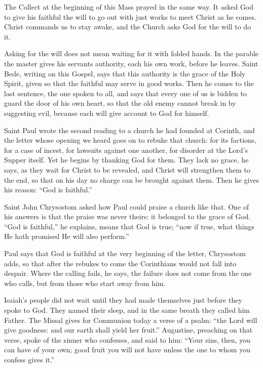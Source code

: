 The Collect at the beginning of this Mass prayed in the same way. It asked
God to give his faithful the will to go out with just works to meet Christ as
he comes. Christ
commands us to stay awake, and the Church asks God for the will to do it.

Asking for the will does not mean waiting for it with folded hands. In the
parable the master gives his servants authority, each his own work, before he
leaves. Saint Bede, writing on this Gospel, says that this authority is the
grace of the Holy Spirit, given so that the faithful may serve in good works.
Then he comes to the last sentence, the one spoken to all, and says that
every one of us is bidden to guard the door of his own heart, so that the old
enemy cannot break in by suggesting evil, because each will give account to
God for himself.

\bigskip

Saint Paul wrote the second reading to a church he had founded at Corinth,
and the letter whose opening we heard goes on to rebuke that church: for its
factions, for a case of incest, for lawsuits against one another, for
disorder at the Lord's Supper itself. Yet he begins by thanking God for them.
They lack no grace, he says, as they wait for Christ to be revealed, and
Christ will strengthen them to the end, so that on his day no charge can be
brought against them. Then he gives his reason: ``God is faithful.''

Saint John Chrysostom asked how Paul could praise a church like that. One of
his answers is that the praise was never theirs: it belonged to the grace of
God. ``God is faithful,'' he explains, means that God is true; ``now if
true, what things He hath promised He will also perform.''

Paul says that God is faithful at the very beginning of the letter,
Chrysostom adds, so that after the rebukes to come the Corinthians would not
fall into despair. Where the calling fails, he says, the failure does not
come from the one who calls, but from those who start away from him.

\bigskip

Isaiah's people did not wait until they had made themselves just before they
spoke to God. They named their sleep, and in the same breath they called him
Father. The Missal gives for Communion today a verse of a psalm: ``the Lord
will give goodness: and our earth shall yield her fruit.'' Augustine,
preaching on that verse, spoke of the sinner who confesses, and said to him:
``Your sins, then, you can have of your own; good fruit you will not have
unless the one to whom you confess gives it.''

